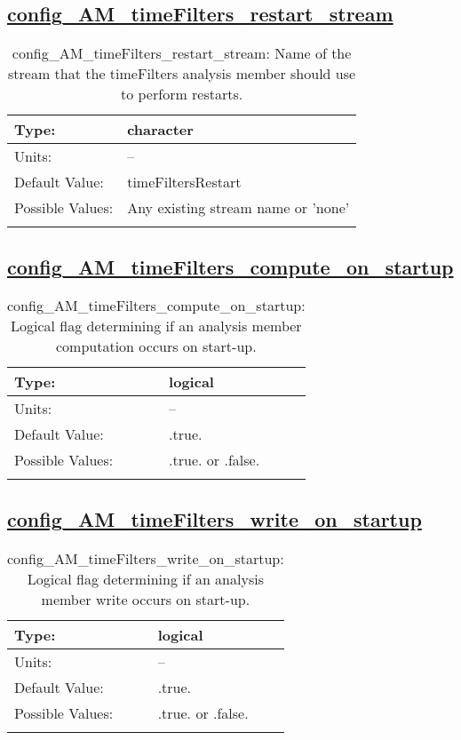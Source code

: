 \subsection[config\_AM\_timeFilters\_restart\_stream]{\hyperref[sec:nm_tab_AM_timeFilters]{config\_AM\_timeFilters\_restart\_stream}}
\label{subsec:nm_sec_config_AM_timeFilters_restart_stream}
\begin{center}
\begin{longtable}{| p{2.0in} || p{4.0in} |}
    \hline
    Type: & character \\
    \hline
    Units: & -- \\
    \hline
    Default Value: & timeFiltersRestart \\
    \hline
    Possible Values: & Any existing stream name or 'none' \\
    \hline
    \caption{config\_AM\_timeFilters\_restart\_stream: Name of the stream that the timeFilters analysis member should use to perform restarts.}
\end{longtable}
\end{center}
\subsection[config\_AM\_timeFilters\_compute\_on\_startup]{\hyperref[sec:nm_tab_AM_timeFilters]{config\_AM\_timeFilters\_compute\_on\_startup}}
\label{subsec:nm_sec_config_AM_timeFilters_compute_on_startup}
\begin{center}
\begin{longtable}{| p{2.0in} || p{4.0in} |}
    \hline
    Type: & logical \\
    \hline
    Units: & -- \\
    \hline
    Default Value: & .true. \\
    \hline
    Possible Values: & .true. or .false. \\
    \hline
    \caption{config\_AM\_timeFilters\_compute\_on\_startup: Logical flag determining if an analysis member computation occurs on start-up.}
\end{longtable}
\end{center}
\subsection[config\_AM\_timeFilters\_write\_on\_startup]{\hyperref[sec:nm_tab_AM_timeFilters]{config\_AM\_timeFilters\_write\_on\_startup}}
\label{subsec:nm_sec_config_AM_timeFilters_write_on_startup}
\begin{center}
\begin{longtable}{| p{2.0in} || p{4.0in} |}
    \hline
    Type: & logical \\
    \hline
    Units: & -- \\
    \hline
    Default Value: & .true. \\
    \hline
    Possible Values: & .true. or .false. \\
    \hline
    \caption{config\_AM\_timeFilters\_write\_on\_startup: Logical flag determining if an analysis member write occurs on start-up.}
\end{longtable}
\end{center}
